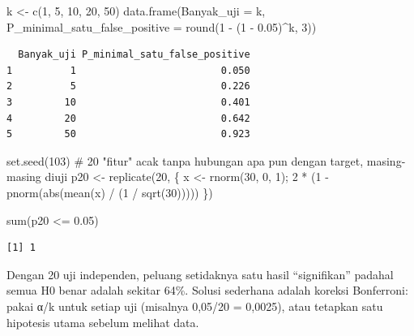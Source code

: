 \documentclass[
  indonesian,
  letterpaper,
]{book}
\newenvironment{Shaded}{\begin{snugshade}}{\end{snugshade}}
\newcommand{\AttributeTok}[1]{\textcolor[rgb]{0.40,0.45,0.13}{#1}}
\newcommand{\CommentTok}[1]{\textcolor[rgb]{0.37,0.37,0.37}{#1}}
\newcommand{\DecValTok}[1]{\textcolor[rgb]{0.68,0.00,0.00}{#1}}
\newcommand{\FloatTok}[1]{\textcolor[rgb]{0.68,0.00,0.00}{#1}}
\newcommand{\FunctionTok}[1]{\textcolor[rgb]{0.28,0.35,0.67}{#1}}
\newcommand{\NormalTok}[1]{\textcolor[rgb]{0.00,0.23,0.31}{#1}}
\newcommand{\OtherTok}[1]{\textcolor[rgb]{0.00,0.23,0.31}{#1}}
\newcommand{\SpecialCharTok}[1]{\textcolor[rgb]{0.37,0.37,0.37}{#1}}
\begin{document}
\begin{Shaded}
\begin{Highlighting}[]
\NormalTok{k }\OtherTok{\textless{}{-}} \FunctionTok{c}\NormalTok{(}\DecValTok{1}\NormalTok{, }\DecValTok{5}\NormalTok{, }\DecValTok{10}\NormalTok{, }\DecValTok{20}\NormalTok{, }\DecValTok{50}\NormalTok{)}
\FunctionTok{data.frame}\NormalTok{(}\AttributeTok{Banyak\_uji =}\NormalTok{ k, }\AttributeTok{P\_minimal\_satu\_false\_positive =} \FunctionTok{round}\NormalTok{(}\DecValTok{1} \SpecialCharTok{{-}}\NormalTok{ (}\DecValTok{1} \SpecialCharTok{{-}} \FloatTok{0.05}\NormalTok{)}\SpecialCharTok{\^{}}\NormalTok{k,}
\DecValTok{3}\NormalTok{))}
\end{Highlighting}
\end{Shaded}

\begin{verbatim}
  Banyak_uji P_minimal_satu_false_positive
1          1                         0.050
2          5                         0.226
3         10                         0.401
4         20                         0.642
5         50                         0.923
\end{verbatim}

\begin{Shaded}
\begin{Highlighting}[]
\FunctionTok{set.seed}\NormalTok{(}\DecValTok{103}\NormalTok{)}
\CommentTok{\# 20 "fitur" acak tanpa hubungan apa pun dengan target, masing{-}masing diuji}
\NormalTok{p20 }\OtherTok{\textless{}{-}} \FunctionTok{replicate}\NormalTok{(}\DecValTok{20}\NormalTok{, \{ x }\OtherTok{\textless{}{-}} \FunctionTok{rnorm}\NormalTok{(}\DecValTok{30}\NormalTok{, }\DecValTok{0}\NormalTok{, }\DecValTok{1}\NormalTok{); }\DecValTok{2} \SpecialCharTok{*}\NormalTok{ (}\DecValTok{1} \SpecialCharTok{{-}} \FunctionTok{pnorm}\NormalTok{(}\FunctionTok{abs}\NormalTok{(}\FunctionTok{mean}\NormalTok{(x) }\SpecialCharTok{/}\NormalTok{ (}\DecValTok{1} \SpecialCharTok{/}
\FunctionTok{sqrt}\NormalTok{(}\DecValTok{30}\NormalTok{))))) \})}

\FunctionTok{sum}\NormalTok{(p20 }\SpecialCharTok{\textless{}=} \FloatTok{0.05}\NormalTok{)}
\end{Highlighting}
\end{Shaded}

\begin{verbatim}
[1] 1
\end{verbatim}

Dengan 20 uji independen, peluang setidaknya satu hasil ``signifikan''
padahal semua H0 benar adalah sekitar 64\%. Solusi sederhana adalah
koreksi Bonferroni: pakai α/k untuk setiap uji (misalnya 0,05/20 =
0,0025), atau tetapkan satu hipotesis utama sebelum melihat data.
\end{document}
